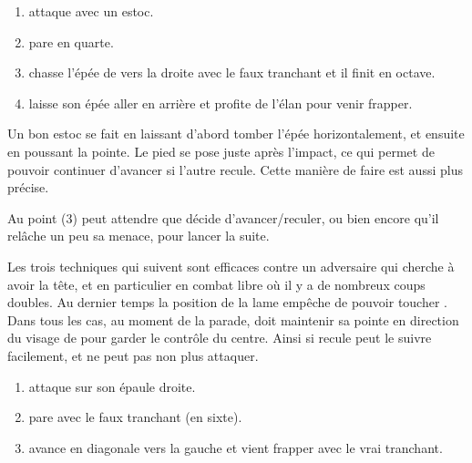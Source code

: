 \begin{technique}

\begin{enumerate}
	\item \A attaque avec un estoc.
	\item \D pare en quarte.
	\item \D chasse l'épée de \A vers la droite avec le faux tranchant et il finit en octave.
	\item \D laisse son épée aller en arrière et profite de l'élan pour venir frapper.
\end{enumerate}

Un bon estoc se fait en laissant d'abord tomber l'épée horizontalement, et ensuite en poussant la pointe.
Le pied se pose juste après l'impact, ce qui permet de pouvoir continuer d'avancer si l'autre recule.
Cette manière de faire est aussi plus précise.

Au point (3) \D peut attendre que \A décide d'avancer/reculer, ou bien encore qu'il relâche un peu sa menace, pour lancer la suite.

\end{technique}


Les trois techniques qui suivent sont efficaces contre un adversaire qui cherche à avoir la tête, et en particulier en combat libre où il y a de nombreux coups doubles.
Au dernier temps la position de la lame empêche \A de pouvoir toucher \D.
Dans tous les cas, au moment de la parade, \D doit maintenir sa pointe en direction du visage de \A pour garder le contrôle du centre.
Ainsi si \A recule \D peut le suivre facilement, et \A ne peut pas non plus attaquer.


\begin{technique}
\label{épée-longue:italien:fiore:tech:faux-tranchant-droite}

\begin{enumerate}
	\item \A attaque \D sur son épaule droite.
	
	\item \D pare avec le faux tranchant (en sixte).
	
	\item \D avance en diagonale vers la gauche et vient frapper \A avec le vrai tranchant.
\end{enumerate}

\end{technique}



